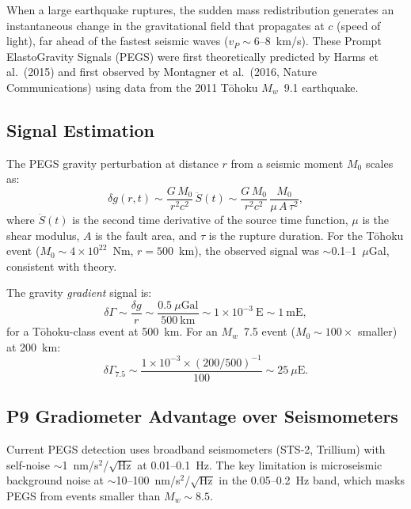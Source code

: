 \documentclass[11pt]{article}
\theoremstyle{definition}
\theoremstyle{remark}
\newcommand{\ee}[1]{\times10^{#1}}
\begin{document}
When a large earthquake ruptures, the sudden mass redistribution
generates an instantaneous change in the gravitational field that
propagates at $c$ (speed of light), far ahead of the fastest seismic
waves ($v_P \sim 6$--8~km/s). These Prompt ElastoGravity Signals
(PEGS) were first theoretically predicted by Harms et al.\ (2015)
and first observed by Montagner et al.\ (2016, Nature Communications)
using data from the 2011 T\={o}hoku $M_w$~9.1 earthquake.

\subsection{Signal Estimation}

The PEGS gravity perturbation at distance $r$ from a seismic moment
$M_0$ scales as:
\begin{equation}
  \delta g(r, t) \sim \frac{G \, M_0}{r^2 c^2} \, \ddot{S}(t)
  \sim \frac{G \, M_0}{r^2 c^2} \, \frac{M_0}{\mu \, A \, \tau^2},
\end{equation}
where $\ddot{S}(t)$ is the second time derivative of the source
time function, $\mu$ is the shear modulus, $A$ is the fault area,
and $\tau$ is the rupture duration. For the T\={o}hoku event
($M_0 \sim 4\ee{22}$~Nm, $r = 500$~km), the observed signal was
$\sim$0.1--1~$\mu$Gal, consistent with theory.

The gravity \emph{gradient} signal is:
\begin{equation}
  \delta\Gamma \sim \frac{\delta g}{r} \sim \frac{0.5~\mu\text{Gal}}{500~\text{km}}
  \sim 1\ee{-3}~\text{E} \sim 1~\text{mE},
\end{equation}
for a T\={o}hoku-class event at 500~km. For an $M_w$~7.5 event
($M_0 \sim 100\times$ smaller) at 200~km:
\begin{equation}
  \delta\Gamma_{7.5} \sim \frac{1\ee{-3} \times (200/500)^{-1}}{100}
  \sim 25~\mu\text{E}.
\end{equation}

\subsection{P9 Gradiometer Advantage over Seismometers}

Current PEGS detection uses broadband seismometers (STS-2, Trillium)
with self-noise $\sim$1~nm/s$^2$/$\sqrt{\text{Hz}}$ at 0.01--0.1~Hz.
The key limitation is microseismic background noise at
$\sim$10--100~nm/s$^2$/$\sqrt{\text{Hz}}$ in the 0.05--0.2~Hz band,
which masks PEGS from events smaller than $M_w \sim 8.5$.
\end{document}
